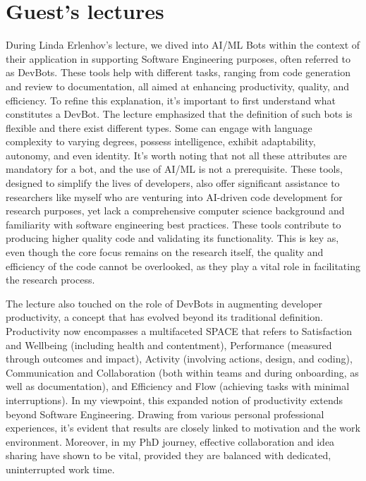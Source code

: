\documentclass[11pt]{article}
\begin{document}
\section{Guest's lectures}

During Linda Erlenhov's lecture, we dived into AI/ML Bots within the context of their application in supporting Software Engineering purposes, often referred to as DevBots. These tools help with different tasks, ranging from code generation and review to documentation, all aimed at enhancing productivity, quality, and efficiency. To refine this explanation, it's important to first understand what constitutes a DevBot. The lecture emphasized that the definition of such bots is flexible and there exist different types. Some can engage with language complexity to varying degrees, possess intelligence, exhibit adaptability, autonomy, and even identity. It's worth noting that not all these attributes are mandatory for a bot, and the use of AI/ML is not a prerequisite.
These tools, designed to simplify the lives of developers, also offer significant assistance to researchers like myself who are venturing into AI-driven code development for research purposes, yet lack a comprehensive computer science background and familiarity with software engineering best practices. These tools contribute to producing higher quality code and validating its functionality. This is key as, even though the core focus remains on the research itself, the quality and efficiency of the code cannot be overlooked, as they play a vital role in facilitating the research process.

The lecture also touched on the role of DevBots in augmenting developer productivity, a concept that has evolved beyond its traditional definition. Productivity now encompasses a multifaceted SPACE that refers to Satisfaction and Wellbeing (including health and contentment), Performance (measured through outcomes and impact), Activity (involving actions, design, and coding), Communication and Collaboration (both within teams and during onboarding, as well as documentation), and Efficiency and Flow (achieving tasks with minimal interruptions). In my viewpoint, this expanded notion of productivity extends beyond Software Engineering. Drawing from various personal professional experiences, it's evident that results are closely linked to motivation and the work environment. Moreover, in my PhD journey, effective collaboration and idea sharing have shown to be vital, provided they are balanced with dedicated, uninterrupted work time.
\end{document}
